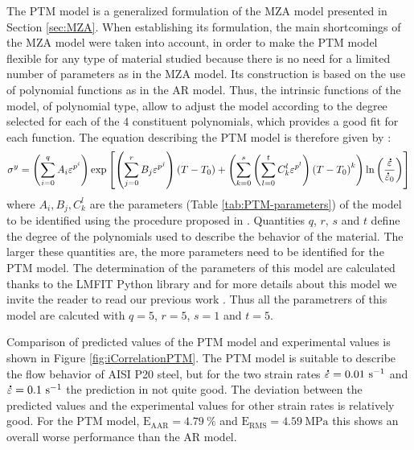 \documentclass[twoside,english,1p,final,sort&compress]{elsarticle}
\theoremstyle{plain}
\newcommand{\mdot}[1]{\accentset{\mbox{\bfseries .}}{#1}}
\newcommand{\RMSE}{\text{E}_\text{RMS}}
\newcommand{\AARE}{\text{E}_\text{AAR}}
\newcommand{\ps}{\text{s}^{-1}}
\begin{document}
The PTM model \cite{TizeMha-2022} is a generalized formulation of the MZA model presented in Section \ref{sec:MZA}.
When establishing its formulation, the main shortcomings of the MZA model were taken into account, in order to make the PTM model flexible for any type of material studied because there is no need for a limited number of parameters as in the MZA model.
Its construction is based on the use of polynomial functions as in the AR model.
Thus, the intrinsic functions of the model, of polynomial type, allow to adjust the model according to the degree selected for each of the 4 constituent polynomials, which provides a good fit for each function.
The equation describing the PTM model is therefore given by :
\begin{equation}
\label{eq:PTM-model}
\sigma^y = \left(\sum_{i=0}^{q}{A_i\varepsilon^{p^i}}\right) \exp\left[\left(\sum_{j=0}^{r}{B_j\varepsilon^{p^j}}\right)\left(T-T_0\right) + \left(\sum_{k=0}^{s}\left(\sum_{l=0}^{t}{C_k^l\varepsilon^{p^l}} \right)\left(T-T_0\right)^k \right)\ln\left( \frac{\mdot\varepsilon}{\mdot{\varepsilon}_0}\right)\right]
\end{equation}
where $A_i, B_j, C_k^l$ are the parameters (Table \ref{tab:PTM-parameters}) of the model to be identified using the procedure proposed in  \cite{TizeMha-2022}.
Quantities $q$, $r$, $s$ and $t$ define the degree of the polynomials used to describe the behavior of the material.
The larger these quantities are, the more parameters need to be identified for the PTM model.
The determination of the parameters of this model are calculated thanks to the LMFIT Python library \cite{Newville-2016} and for more details about this model  we invite the reader to read our previous work \cite{TizeMha-2022}.
Thus all the parametrers of this model are calcuted with $q=5$, $r=5$, $s=1$ and $t=5$.

Comparison of predicted values of the PTM model and experimental values is shown in Figure \ref{fig:iCorrelationPTM}.
The PTM model is suitable to describe the ﬂow behavior of AISI P20 steel, but for the two strain rates $\mdot\varepsilon=0.01~\ps$ and $\mdot\varepsilon=0.1~\ps$ the prediction in not quite good.
The deviation between the predicted values and the experimental values for other strain rates is relatively good.
For the PTM model, $\AARE=4.79~\%$ and $\RMSE=4.59~\text{MPa}$ this shows an overall worse performance than the AR model.
\end{document}
